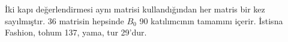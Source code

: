 \begin{table}[!t]
\centering\footnotesize
\setlength{\tabcolsep}{3.5pt}
\caption{Farklı saldırılı kontrol noktası matrislerinde ilk kabul havuzunun radyal oranı. Eşik $\tau=2$ değeridir.}\label{tab:gamma}

\vspace{2pt}\parbox{\linewidth}{\scriptsize İki kapı değerlendirmesi aynı matrisi kullandığından her matris bir kez sayılmıştır. 36 matrisin hepsinde $B_0$ 90 katılımcının tamamını içerir. İstisna Fashion, tohum 137, yama, tur 29'dur.}
\end{table}
